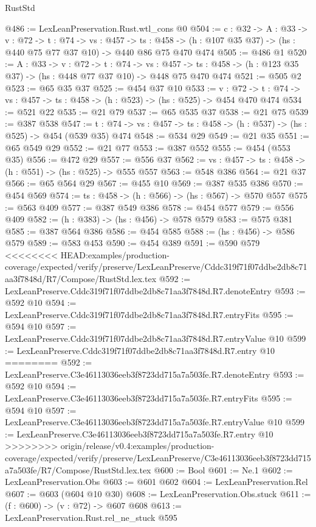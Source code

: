 \begin{lexlean}{RustStd}
\begin{coremodule}
{\begin{coremodule}
@486 := LexLeanPreservation.Rust.wtl_cons @0
@504 := {c : @32} ->
  {A : @33} ->
  {v : @72} ->
  {t : @74} ->
  {vs : @457} ->
  {ts : @458} -> (h : @107 @35 @37) -> (hs : @440 @75 @77 @37 @10) -> @440 @86 @75 @470 @474
@505 := @486 @1
@520 := {A : @33} ->
  {v : @72} ->
  {t : @74} ->
  {vs : @457} -> {ts : @458} -> (h : @123 @35 @37) -> (hs : @448 @77 @37 @10) -> @448 @75 @470 @474
@521 := @505 @2
@523 := @65 @35 @37
@525 := @454 @37 @10
@533 := {v : @72} ->
  {t : @74} -> {vs : @457} -> {ts : @458} -> (h : @523) -> (hs : @525) -> @454 @470 @474
@534 := @521 @22
@535 := @21 @79
@537 := @65 @535 @37
@538 := @21 @75
@539 := @387 @538
@547 := {t : @74} -> {vs : @457} -> {ts : @458} -> (h : @537) -> (hs : @525) -> @454 (@539 @35) @474
@548 := @534 @29
@549 := @21 @35
@551 := @65 @549 @29
@552 := @21 @77
@553 := @387 @552
@555 := @454 (@553 @35)
@556 := @472 @29
@557 := @556 @37
@562 := {vs : @457} -> {ts : @458} -> (h : @551) -> (hs : @525) -> @555 @557
@563 := @548 @386
@564 := @21 @37
@566 := @65 @564 @29
@567 := @455 @10
@569 := @387 @535 @386
@570 := @454 @569
@574 := {ts : @458} -> (h : @566) -> (hs : @567) -> @570 @557
@575 := @563 @409
@577 := @387 @549 @386
@578 := @454 @577
@579 := @556 @409
@582 := (h : @383) -> (hs : @456) -> @578 @579
@583 := @575 @381
@585 := @387 @564 @386
@586 := @454 @585
@588 := (hs : @456) -> @586 @579
@589 := @583 @453
@590 := @454 @389
@591 := @590 @579
<<<<<<<< HEAD:examples/production-coverage/expected/verify/preserve/LexLeanPreserve/Cddc319f71f07ddbe2db8c71aa3f7848d/R7/Compose/RustStd.lex.tex
@592 := LexLeanPreserve.Cddc319f71f07ddbe2db8c71aa3f7848d.R7.denoteEntry
@593 := @592 @10
@594 := LexLeanPreserve.Cddc319f71f07ddbe2db8c71aa3f7848d.R7.entryFits
@595 := @594 @10
@597 := LexLeanPreserve.Cddc319f71f07ddbe2db8c71aa3f7848d.R7.entryValue @10
@599 := LexLeanPreserve.Cddc319f71f07ddbe2db8c71aa3f7848d.R7.entry @10
========
@592 := LexLeanPreserve.C3e46113036eeb3f8723dd715a7a503fe.R7.denoteEntry
@593 := @592 @10
@594 := LexLeanPreserve.C3e46113036eeb3f8723dd715a7a503fe.R7.entryFits
@595 := @594 @10
@597 := LexLeanPreserve.C3e46113036eeb3f8723dd715a7a503fe.R7.entryValue @10
@599 := LexLeanPreserve.C3e46113036eeb3f8723dd715a7a503fe.R7.entry @10
>>>>>>>> origin/release/v0.4:examples/production-coverage/expected/verify/preserve/LexLeanPreserve/C3e46113036eeb3f8723dd715a7a503fe/R7/Compose/RustStd.lex.tex
@600 := Bool
@601 := Ne.{1}
@602 := LexLeanPreservation.Obs
@603 := @601 @602
@604 := LexLeanPreservation.Rel
@607 := @603 (@604 @10 @30)
@608 := LexLeanPreservation.Obs.stuck
@611 := (f : @600) -> (v : @72) -> @607 @608
@613 := LexLeanPreservation.Rust.rel_ne_stuck @595

\end{coremodule}}
\end{coremodule}
\end{lexlean}
